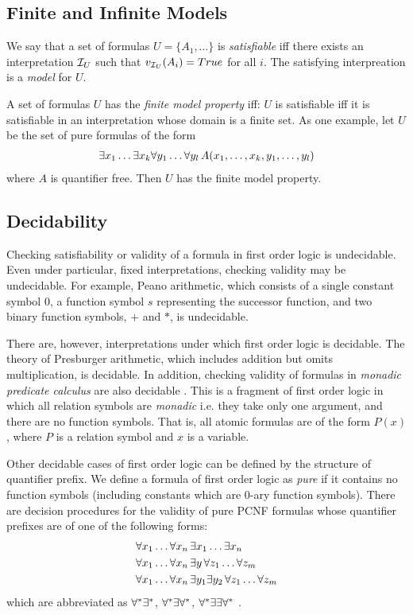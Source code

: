 \documentclass[10pt]{article}
\begin{document}
\subsection{Finite and Infinite Models}

We say that a set of formulas $U=\{A_1,\dots\}$ is \textit{satisfiable} iff there exists an interpretation $\mathcal{I}_U$ such that $v_{\mathcal{I}_U}(A_i)=True$ for all $i$. The satisfying interpreation is a \textit{model} for $U$. 

A set of formulas $U$ has the \textit{finite model property} iff: $U$ is satisfiable iff it is satisfiable in an interpretation whose domain is a finite set. As one example, let $U$ be the set of pure formulas of the form 
\begin{align*}
    \exists x_1 \dots \exists x_k \forall y_1 \dots \forall y_l \, A(x_1,\dots,x_k,y_1,\dots,y_l)
\end{align*}
where $A$ is quantifier free. Then $U$ has the finite model property.

\subsection{Decidability}

Checking satisfiability or validity of a formula in first order logic is undecidable. Even under particular, fixed interpretations, checking validity may be undecidable. For example, Peano arithmetic, which consists of a single constant symbol $0$, a function symbol $s$ representing the successor function, and two binary function symbols, $+$ and $*$, is undecidable. 

There are, however, interpretations under which first order logic is decidable. The theory of Presburger arithmetic, which includes addition but omits multiplication, is decidable. In addition, checking validity of formulas in \textit{monadic predicate calculus} are also decidable \cite{lewis1980complexity}. This is a fragment of first order logic in which all relation symbols are \textit{monadic} i.e. they take only one argument, and there are no function symbols. That is, all atomic formulas are of the form $P(x)$, where $P$ is a relation symbol and $x$ is a variable.

Other decidable cases of first order logic can be defined by the structure of quantifier prefix. We define a formula of first order logic as \textit{pure} if it contains no function symbols (including constants which are 0-ary function symbols). There are decision procedures for the validity of pure PCNF formulas whose quantifier prefixes are of one of the following forms:
\begin{align}
    &\forall x_1\dots\forall x_n \,\exists x_1\dots\exists x_n \\
    &\forall x_1\dots\forall x_n \, \exists y \, \forall z_1\dots\forall z_m \\
    &\forall x_1\dots\forall x_n \, \exists y_1 \exists y_2 \, \forall z_1\dots\forall z_m 
\end{align}  
which are abbreviated as $\forall^*\exists^*$, $\forall^*\exists\forall^*$, $\forall^*\exists\exists\forall^*$ \cite{Dreben1979TheDP}. 
\end{document}
